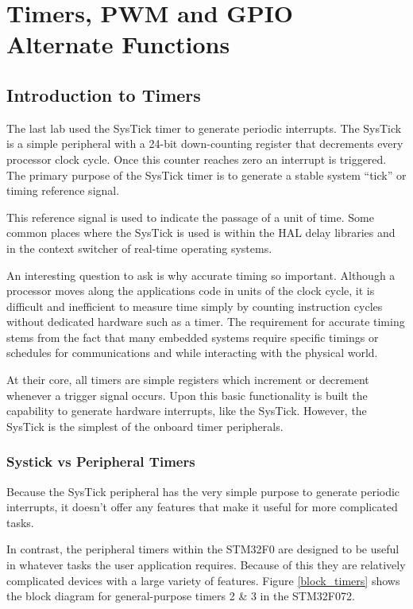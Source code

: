 \documentclass[11pt,fleqn]{book} %
\begin{document}
	
\chapter{Timers, PWM and GPIO Alternate Functions}

\section{Introduction to Timers}
The last lab used the SysTick timer to generate periodic interrupts. The SysTick is a simple peripheral with a 24-bit down-counting register that decrements every processor clock cycle. Once this counter reaches zero an interrupt is triggered. The primary purpose of the SysTick timer is to generate a stable system ``tick'' or timing reference signal. 

This reference signal is used to indicate the passage of a unit of time. Some common places where the SysTick is used is within the HAL delay libraries and in the context switcher of real-time operating systems. 

An interesting question to ask is why accurate timing so important. Although a processor moves along the applications code in units of the clock cycle, it is difficult and inefficient to measure time simply by counting instruction cycles without dedicated hardware such as a timer. The requirement for accurate timing stems from the fact that many embedded systems require specific timings or schedules for communications and while interacting with the physical world.

At their core, all timers are simple registers which increment or decrement whenever a trigger signal occurs. Upon this basic functionality is built the capability to generate hardware interrupts, like the SysTick. However, the SysTick is the simplest of the onboard timer peripherals.
    
    \subsection{Systick vs Peripheral Timers}
     Because the SysTick peripheral has the very simple purpose to generate periodic interrupts, it doesn't offer any features that make it useful for more complicated tasks. 
     
     In contrast, the peripheral timers within the STM32F0 are designed to be useful in whatever tasks the user application requires. Because of this they are relatively complicated devices with a large variety of features. Figure \ref{block_timers} shows the block diagram for general-purpose timers 2 \& 3 in the STM32F072.  
\end{document}
